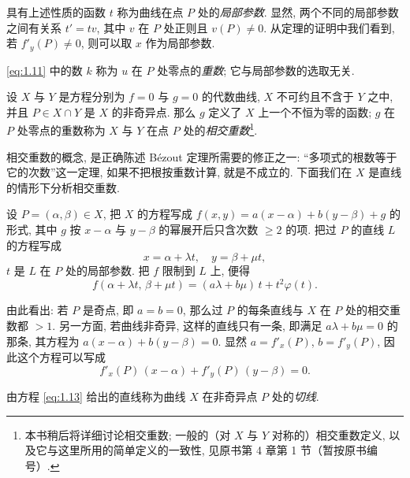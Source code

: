 \begin{definition}[局部参数]\label{def:local-parameter}
	具有上述性质的函数 $t$ 称为曲线在点 $P$ 处的\emph{局部参数}. 显然, 两个不同的局部参数之间有关系 $t' = tv$, 其中 $v$ 在 $P$ 处正则且 $v(P) \ne 0$. 从定理的证明中我们看到, 若 $f'_y(P) \ne 0$, 则可以取 $x$ 作为局部参数.
\end{definition}

\eqref{eq:1.11} 中的数 $k$ 称为 $u$ 在 $P$ 处零点的\emph{重数}; 它与局部参数的选取无关.

\begin{definition}[相交重数]\label{def:intersection-mult}
	设 $X$ 与 $Y$ 是方程分别为 $f = 0$ 与 $g = 0$ 的代数曲线, $X$ 不可约且不含于 $Y$ 之中, 并且 $P \in X \cap Y$ 是 $X$ 的非奇异点. 那么 $g$ 定义了 $X$ 上一个不恒为零的函数; $g$ 在 $P$ 处零点的重数称为 $X$ 与 $Y$ 在点 $P$ 处的\emph{相交重数}\footnote{本书稍后将详细讨论相交重数; 一般的（对 $X$ 与 $Y$ 对称的）相交重数定义, 以及它与这里所用的简单定义的一致性, 见原书第 4 章第 1 节（暂按原书编号）.}.
\end{definition}

相交重数的概念, 是正确陈述 Bézout 定理所需要的修正之一: ``多项式的根数等于它的次数''这一定理, 如果不把根按重数计算, 就是不成立的. 下面我们在 $X$ 是直线的情形下分析相交重数.

设 $P = (\alpha, \beta) \in X$, 把 $X$ 的方程写成 $f(x,y) = a(x-\alpha) + b(y-\beta) + g$ 的形式, 其中 $g$ 按 $x - \alpha$ 与 $y - \beta$ 的幂展开后只含次数 $\ge 2$ 的项. 把过 $P$ 的直线 $L$ 的方程写成
\begin{equation}
	\label{eq:1.12}
	x = \alpha + \lambda t, \quad y = \beta + \mu t,
\end{equation}
$t$ 是 $L$ 在 $P$ 处的局部参数. 把 $f$ 限制到 $L$ 上, 便得
\[
	f(\alpha + \lambda t,\, \beta + \mu t) = (a\lambda + b\mu)\, t + t^2 \varphi(t).
\]

由此看出: 若 $P$ 是奇点, 即 $a = b = 0$, 那么过 $P$ 的每条直线与 $X$ 在 $P$ 处的相交重数都 $> 1$. 另一方面, 若曲线非奇异, 这样的直线只有一条, 即满足 $a\lambda + b\mu = 0$ 的那条, 其方程为 $a(x-\alpha) + b(y-\beta) = 0$. 显然 $a = f'_x(P)$, $b = f'_y(P)$, 因此这个方程可以写成
\begin{equation}
	\label{eq:1.13}
	f'_x(P)\,(x - \alpha) + f'_y(P)\,(y - \beta) = 0.
\end{equation}

\begin{definition}[切线]\label{def:tangent-line}
	由方程 \eqref{eq:1.13} 给出的直线称为曲线 $X$ 在非奇异点 $P$ 处的\emph{切线}.
\end{definition}

